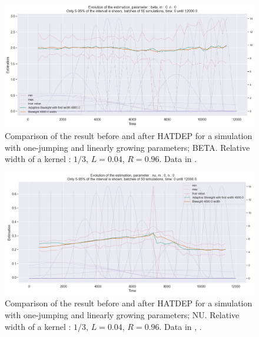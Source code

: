 \begin{figure}
\centering
\includegraphics[width = 0.90 \textwidth]{../imag/chap3/3/K.png}
\caption{Comparison of the result before and after HATDEP for a simulation with one-jumping and linearly growing parameters; BETA. Relative width of a kernel : $1/3$, $L = 0.04$, $R = 0.96$. Data in \protect {}.}
\label{fig:first_estimate_3_beta}
\end{figure}

\begin{figure}
\centering
\includegraphics[width = 0.90 \textwidth]{../imag/chap3/3/L.png}
\caption{Comparison of the result before and after HATDEP for a simulation with one-jumping and linearly growing parameters; NU. Relative width of a kernel : $1/3$, $L = 0.04$, $R = 0.96$. Data in \protect {}, \protect {}.}
\label{fig:first_estimate_3_nu}
\end{figure}















